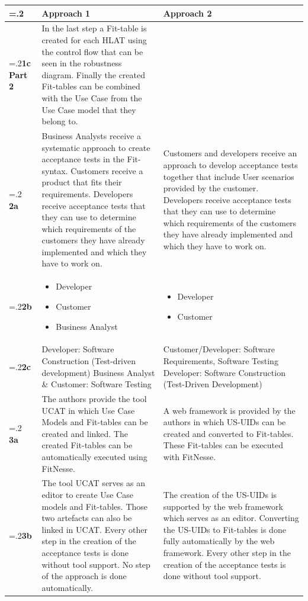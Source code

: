 	\begin{tabularx}{\textwidth}{>{\hsize=.2\hsize}X|X|X}
  		 & \textbf{Approach 1} & \textbf{Approach 2} \\
  		\hline
  		\textbf{1c Part 2} &
In the last step a Fit-table is created for each HLAT using the control flow that can be seen in the robustness diagram. 
Finally the created Fit-tables can be combined with the Use Case from the Use Case model that they belong to. & \\
  		\hline
  		 \textbf{2a} & Business Analysts receive a systematic approach to create acceptance tests in the Fit-syntax.
Customers receive a product that fits their requirements.
Developers receive acceptance tests that they can use to determine which requirements of the customers they have already implemented and which they have to work on.
 & Customers and developers receive an approach to develop acceptance tests together that include User scenarios provided by the customer.
Developers receive acceptance tests that they can use to determine which requirements of the customers they have already implemented and which they have to work on.
 \\
  		 \textbf{2b} & \begin{itemize}
  		 \item Developer \item Customer \item  Business Analyst
\end{itemize}  		  & \begin{itemize}
  		 \item Developer \item Customer
\end{itemize}  \\
  		 \textbf{2c} & Developer: Software Construction (Test-driven development) \newline
Business Analyst \& Customer: Software Testing
 & Customer/Developer: Software Requirements, Software Testing \newline
Developer: Software Construction (Test-Driven Development)
 \\
  		\hline
  		 \textbf{3a} & The authors provide the tool UCAT in which Use Case Models and Fit-tables can be created and linked. The created Fit-tables can be automatically executed using FitNesse. & A web framework is provided by the authors in which US-UIDs can be created and converted to Fit-tables. These Fit-tables can be executed with FitNesse. \\
  		 \textbf{3b} & The tool UCAT serves as an editor to create Use Case models and Fit-tables. Those two artefacts can also be linked in UCAT.
Every other step in the creation of the acceptance tests is done without tool support.
No step of the approach is done automatically.
 & The creation of the US-UIDs is supported by the web framework which serves as an editor.
Converting the US-UIDs to Fit-tables is done fully automatically by the web framework.
Every other step in the creation of the acceptance tests is done without tool support.
 \\
 \end{tabularx}

